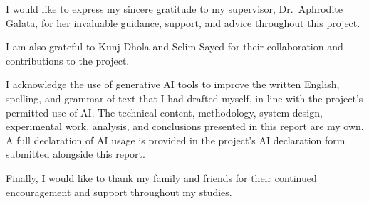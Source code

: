 \hspace{\parindent}I would like to express my sincere gratitude to my
supervisor, Dr.\ Aphrodite Galata, for her invaluable guidance, support,
and advice throughout this project.

I am also grateful to Kunj Dhola and Selim Sayed for their collaboration
and contributions to the project.

I acknowledge the use of generative AI tools to improve the written English, 
spelling, and grammar of text that I had drafted myself, in line with the project's
 permitted use of AI. The technical content, methodology, system design, experimental work, analysis, 
 and conclusions presented in this report are my own. A full declaration of AI 
 usage is provided in the project's AI declaration form submitted alongside this report.

Finally, I would like to thank my family and friends for their continued
encouragement and support throughout my studies.